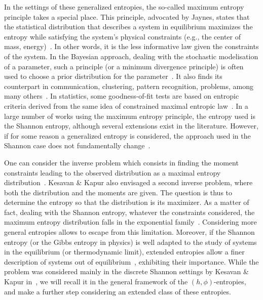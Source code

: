\documentclass[entropy,article,submit,moreauthors,pdftex]{Definitions/mdpi}
\newcommand{\SZ}[1]{{\color{blue} #1}}
\newcommand{\jfb}[1]{{\color{red} #1}}
\begin{document}
In the  settings of these  generalized entropies, the so-called  maximum entropy
principle takes  a special place.   This principle, advocated by  Jaynes, states
that  the  statistical  distribution  that describes  a  system  in  equilibrium
maximizes the entropy while satisfying  the system's physical constraints (e.g.,
the  center of  mass, energy)~\cite{Jay57,  Kap89, Arn01,  CovTho06, Gok75}.  In
other  words, it  is  the less  informative  law given  the  constraints of  the
system. In the Bayesian approach, dealing  with the stochastic modelisation of a
parameter, such a principle (or a minimum divergence principle) is often used to
choose  a  prior  distribution  for  the  parameter~\cite{Jay68,  Csi91,  Bas13,
  FriSri08, Rob07}. It also finds  its counterpart in communication, clustering,
pattern recognition,  problems, among many others~\cite{Kap89,  Jay82, JonByr90,
  Arn01,  HerMa02, ParBer09}.   In  statistics, some  goodness-of-fit tests  are
based on  entropic criteria derived  from the  same idea of  constrained maximal
entropic  law~\cite{Vas76, Gok83,  Son02, Leq14,  Leq15, GirReg15}.  In a  large
number of  works using the  maximum entropy principle,  the entropy used  is the
Shannon entropy, although several extensions  exist in the literature.  However,
if for some reason a generalized entropy is considered, the approach used in the
Shannon   case  does   not  fundamentally   change~\cite{KesKap89,  BorLew91:03,
  BorLew91:05, BorLew93}.

One  can consider  the  inverse problem  which consists  in  finding the  moment
constraints  leading  to   the  observed  distribution  as   a  maximal  entropy
distribution~\cite{KesKap89}.  Kesavan \& Kapur  also envisaged a second inverse
problem, where both the distribution and the moments are given.  The question is
thus to determine the entropy so that the distribution is its maximizer. \SZ{ As
  a matter of  fact, dealing with the Shannon entropy,  whatever the constraints
  considered,  the  maximum  entropy   distribution  falls  in  the  exponential
  family~\cite{CovTho06,  BorLew91:05,   Arn01,  MezMon09}.    Considering  more
  general entropies  allows to  escape from this  limitation.  Moreover,  if the
  Shannon entropy (or the Gibbs entropy in physics) is well adapted to the study
  of systems  in the  equilibrium (or  thermodynamic limit),  extended entropies
  allow a finer description of systems out of equilibrium~\cite{Tsa88, TsaMen98,
    Tsa99, Tsa09, EssSch00, ParBir05}, exhibiting their importance.}
While the  problem was  considered mainly  in the  discrete Shannon  settings by
Kesavan \& Kapur in~\cite{KesKap89}, we will  recall it in the general framework
of the  $(h,\phi)$-entropies, and  make a further  step considering  an extended
class of these entropies.
\end{document}
